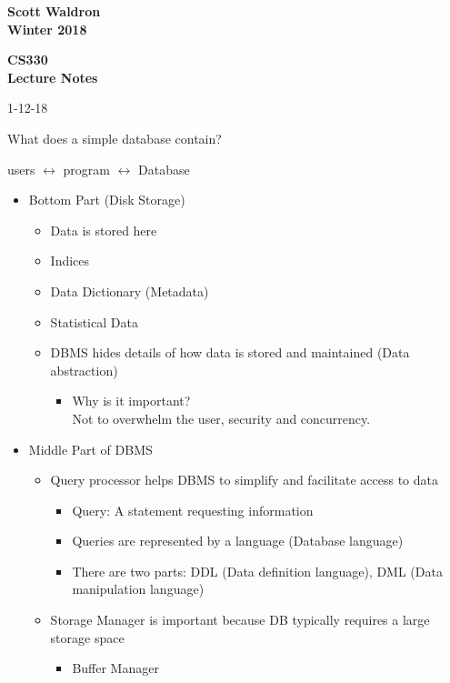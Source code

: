 \documentclass{article}%
\begin{document}
\begin{flushright}
\textbf{Scott Waldron \\
        Winter 2018}
\end{flushright}

\begin{flushleft}
\textbf{CS330 \\
Lecture Notes} \\
\end{flushleft}
\begin{center}
1-12-18
\end{center}

What does a simple database contain?

users $\longleftrightarrow$ program $\longleftrightarrow$ Database\\
\begin{itemize}
\item Bottom Part (Disk Storage)
\begin{itemize}
\item Data is stored here
\item Indices
\item Data Dictionary (Metadata)
\item Statistical Data
\item DBMS hides details of how data is stored and maintained (Data abstraction)
\begin{itemize}
\item Why is it important?\\
Not to overwhelm the user, security and concurrency.
\end{itemize}
\end{itemize}
\item Middle Part of DBMS
\begin{itemize}
\item Query processor helps DBMS to simplify and facilitate access to data
\begin{itemize}
\item Query: A statement requesting information
\item Queries are represented by a language (Database language)
\item There are two parts: DDL (Data definition language), DML (Data manipulation language)
\end{itemize}
\item Storage Manager is important because DB typically requires a large storage space
\begin{itemize}
\item Buffer Manager

\end{itemize}
\end{itemize}
\end{itemize}
\end{document}
